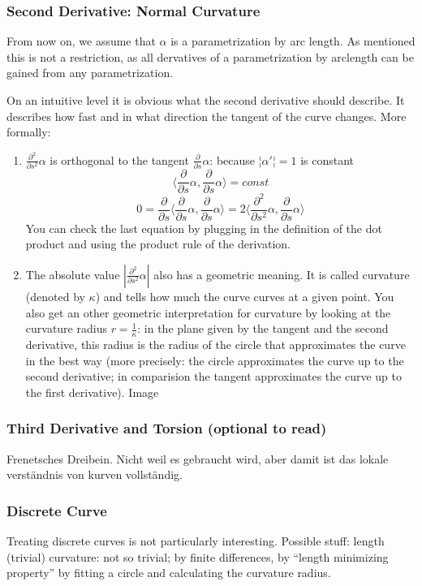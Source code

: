 	\subsubsection*{Second Derivative: Normal Curvature}
	From now on, we assume that $\alpha$ is a parametrization by arc length. As mentioned this is not a restriction, as all dervatives of a parametrization by arclength can be gained from any parametrization.
	
	On an intuitive level it is obvious what the second derivative should describe. It describes how fast and in what direction the tangent of the curve changes. More formally:

	\begin{enumerate}
	 \item $\frac{\partial^2 }{\partial s^2} \alpha$ is orthogonal to the tangent $\frac{\partial}{\partial s} \alpha$: because $¦\alpha'¦= 1$ is constant 
		\[\langle \frac{\partial}{\partial s} \alpha,\frac{\partial}{\partial s} \alpha\rangle = const\]
		\[0=\frac{\partial}{\partial s} \langle \frac{\partial}{\partial s} \alpha,\frac{\partial}{\partial s} \alpha\rangle = 2 \langle \frac{\partial^2}{\partial s^2} \alpha,\frac{\partial}{\partial s} \alpha\rangle\]
	You can check the last equation by plugging in the definition of the dot product and using the product rule of the derivation.
	 \item The absolute value $|\frac{\partial^2}{\partial s^2} \alpha|$ also has a geometric meaning. It is called curvature (denoted by $\kappa$) and tells how much the curve curves at a given point. You also get an other geometric interpretation for curvature by looking at the curvature radius $r= \frac{1}{\kappa}$: in the plane given by the tangent and the second derivative, this radius is the radius of the circle that approximates the curve in the best way (more precisely: the circle approximates the curve up to the second derivative; in comparision the tangent approximates the curve up to the first derivative). Image 
	\end{enumerate}


	\subsubsection*{Third Derivative and Torsion (optional to read)}
	Frenetsches Dreibein. Nicht weil es gebraucht wird, aber damit ist das lokale verständnis von kurven vollständig.
	
	\subsubsection{Discrete Curve}
	Treating discrete curves is not particularly interesting.
	Possible stuff: length (trivial) curvature: not so trivial; by finite differences, by ``length minimizing property'' by fitting a circle and calculating the curvature radius.

